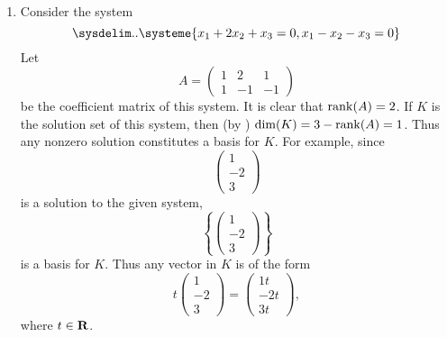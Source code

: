 \begin{example} \label{example 3.3.2} \ 

\begin{enumerate}
\item Consider the system
\[
    \sysdelim..\systeme{
        x_1 + 2 x_2 + x_3 = 0,
        x_1 - x_2 - x_3 = 0
    }
\]
Let
\[
    A = \left(\begin{array}{rrr}
        1 & 2 & 1 \\
        1 & -1 & -1
    \end{array}\right)
\]
be the coefficient matrix of this system.
It is clear that \(\mathrm{rank}(A) = 2\).
If \(K\) is the solution set of this system, then (by ) \(\dim(K) = 3 - \mathrm{rank}(A) = 1\).
Thus any nonzero solution constitutes a basis for \(K\).
For example, since
\[
    \begin{pmatrix} 1 \\ -2 \\ 3 \end{pmatrix}
\]
is a solution to the given system,
\[
    \left\{ \begin{pmatrix} 1 \\ -2 \\ 3 \end{pmatrix} \right\}
\]
is a basis for \(K\).
Thus any vector in \(K\) is of the form
\[
    t \begin{pmatrix} 1 \\ -2 \\ 3 \end{pmatrix} = \begin{pmatrix} 1t \\ -2t \\ 3t \end{pmatrix},
\]
where \(t \in \mathbf{R}\).


\end{enumerate}
\end{example}
